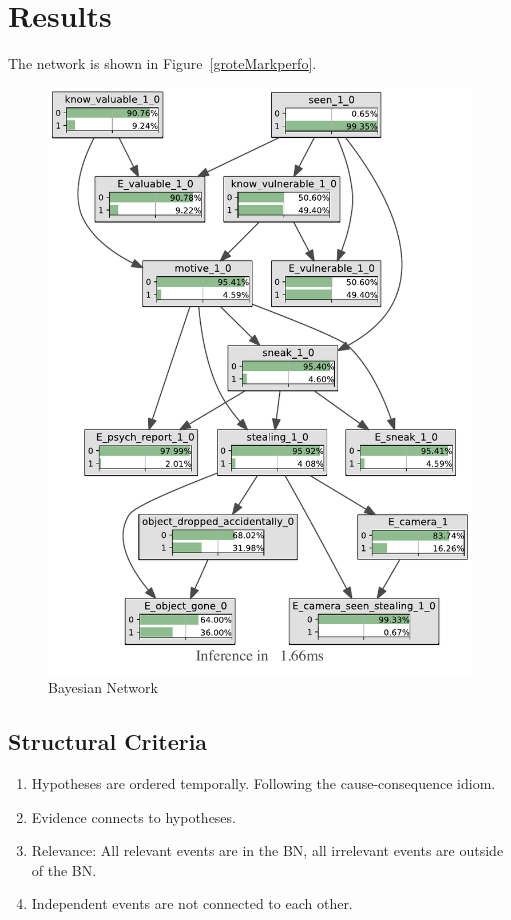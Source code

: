 \section{Results}

The network is shown in Figure~\ref{groteMarkperfo}.
\begin{figure}[htbp]
\begin{center}
\includegraphics[width=.7\linewidth]{../experiments/GroteMarkt/bnImage/BNIMAGEGroteMarkt.pdf}
\caption{Bayesian Network}
\label{groteMarktperfo}
\end{center}
\end{figure}

\subsection{Structural Criteria}
\begin{enumerate}
\item Hypotheses are ordered temporally. Following the cause-consequence idiom.
\item Evidence connects to hypotheses.
\item Relevance: All relevant events are in the BN, all irrelevant events are outside of the BN.
\item Independent events are not connected to each other.
\end{enumerate}

